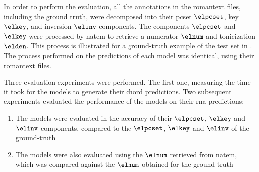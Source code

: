 
In order to perform the evaluation, all the annotations in
the \gls{romantext} files, including the ground truth, were
decomposed into their \gls{pcset} $\elpcset$, key $\elkey$,
and inversion $\elinv$ components. The components $\elpcset$
and $\elkey$ were processed by \gls{natem} to retrieve a
numerator $\elnum$ and tonicization $\elden$. This process
is illustrated for a ground-truth example of the test set in
. The process performed on the
predictions of each model was identical, using their
\gls{romantext} files.


Three evaluation experiments were performed. The first one,
measuring the time it took for the models to generate their
chord predictions. Two subsequent experiments evaluated the
performance of the models on their \gls{rna} predictions:

\begin{enumerate}
    \item The models were evaluated in the accuracy of their
    $\elpcset$, $\elkey$ and $\elinv$ components, compared
    to the $\elpcset$, $\elkey$ and $\elinv$ of the
    ground-truth
    \item The models were also evaluated using the $\elnum$
    retrieved from \gls{natem}, which was compared against
    the $\elnum$ obtained for the ground truth
\end{enumerate}




